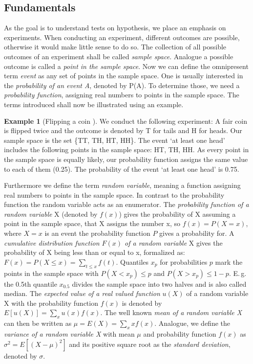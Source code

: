 \documentclass{article}
\theoremstyle{definition}
\newtheorem*{example}{Example}
\begin{document}
\subsection{Fundamentals}
As the goal is to understand tests on hypothesis, we place an emphasis on experiments.
When conducting an experiment, different outcomes are possible, otherwise it would make little sense to do so.
The collection of all possible outcomes of an experiment shall be called \emph{sample space}.
Analogue a possible outcome is called a \emph{point in the sample space}.
Now we can define the omnipresent term \emph{event} as any set of points in the sample space.
One is usually interested in the \emph{probability of an event A}, denoted by P(A).
To determine those, we need a \emph{probability function}, assigning real numbers to points in the sample space.
The terms introduced shall now be illustrated using an example.
\begin{example}[Flipping a coin \cite{conover1980practical}]
	We conduct the following experiment:
	A fair coin is flipped twice and the outcome is denoted by T for tails and H for heads.
	Our sample space is the set \{TT, TH, HT, HH\}.
	The event `at least one head' includes the following points in the sample space: HT, TH, HH.
	As every point in the sample space is equally likely, our probability function assigns the same value to each of them (0.25).
	The probability of the event `at least one head' is 0.75.
\end{example}
Furthermore we define the term \emph{random variable}, meaning a function assigning real numbers to points in the sample space.
In contrast to the probability function the random variable acts as an enumerator.
The \emph{probability function of a random variable} X (denoted by $f(x)$) gives the probability of X assuming a point in the sample space, that X assigns the number x, so $f(x) = P(X = x)$, where $X = x$ is an event the probability function $P$ gives a probability for.
A \emph{cumulative distribution function $F(x)$ of a random variable} X gives the probability of X being less than or equal to x, formalized as: $F(x) = P(X \leq x) = \sum_{t\leq x}f(t)$.
Quantiles $x_p$ for probabilities $p$ mark the points in the sample space with $P(X<x_p)\leq p$ and $P(X>x_p)\leq 1-p$.
E.\,g. the 0.5th quantile $x_{0.5}$ divides the sample space into two halves and is also called median.
The \emph{expected value of a real valued function} $u(X)$ of a random variable X with the probability function $f(x)$ is denoted by $E[u(X)] = \sum_{x}u(x)f(x)$.
The well known \emph{mean of a random variable X} can then be written as $\mu = E(X) = \sum_{x}xf(x)$.
Analogue, we define the \emph{variance of a random variable X} with mean $\mu$ and probability function $f(x)$ as $\sigma^2 = E[(X-\mu)^2]$ and its positive square root as the \emph{standard deviation}, denoted by $\sigma$.
\end{document}
